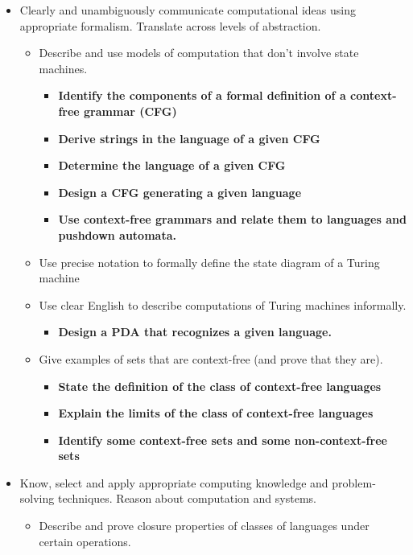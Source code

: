 \begin{itemize}
    \item Clearly and unambiguously communicate computational ideas using appropriate formalism. Translate across levels of abstraction.
    \begin{itemize}
        \item Describe and use models of computation that don't involve state machines.
        \begin{itemize}
            \item {\bf Identify the components of a formal definition of a context-free grammar (CFG)}
            \item {\bf Derive strings in the language of a given CFG}
            \item {\bf Determine the language of a given CFG}
            \item {\bf Design a CFG generating a given language}
            \item {\bf Use context-free grammars and relate them to languages and pushdown automata.}
        \end{itemize}
        \item Use precise notation to formally define the state diagram of a Turing machine
        \item Use clear English to describe computations of Turing machines informally.
        \begin{itemize}
            \item {\bf Design a PDA that recognizes a given language.}
         \end{itemize}
       \item Give examples of sets that are context-free (and prove that they are).
       \begin{itemize}
          \item {\bf State the definition of the class of context-free languages}
          \item {\bf Explain the limits of the class of context-free languages}
          \item {\bf Identify some context-free sets and some non-context-free sets}
       \end{itemize}
    \end{itemize}
    \item Know, select and apply appropriate computing knowledge and problem-solving techniques. 
    Reason about computation and systems.
    \begin{itemize}
        \item Describe and prove closure properties of classes of languages under certain operations.

\end{itemize}
\end{itemize}
